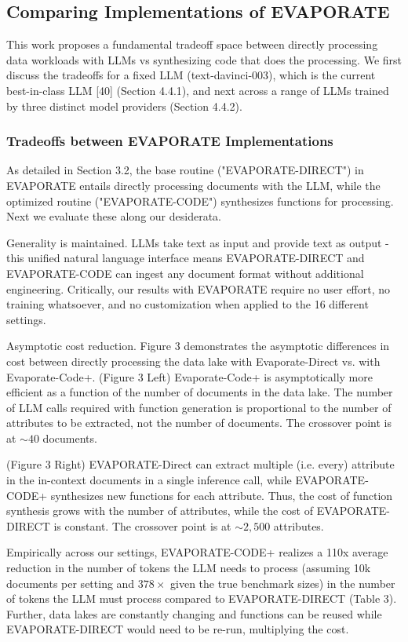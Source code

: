 \documentclass[10pt]{article}
\begin{document}
\subsection{Comparing Implementations of EVAPORATE}
This work proposes a fundamental tradeoff space between directly processing data workloads with LLMs vs synthesizing code that does the processing. We first discuss the tradeoffs for a fixed LLM (text-davinci-003), which is the current best-in-class LLM [40] (Section 4.4.1), and next across a range of LLMs trained by three distinct model providers (Section 4.4.2).

\subsubsection{Tradeoffs between EVAPORATE Implementations}
As detailed in Section 3.2, the base routine ("EVAPORATE-DIRECT") in EVAPORATE entails directly processing documents with the LLM, while the optimized routine ("EVAPORATE-CODE") synthesizes functions for processing. Next we evaluate these along our desiderata.

Generality is maintained. LLMs take text as input and provide text as output - this unified natural language interface means EVAPORATE-DIRECT and EVAPORATE-CODE can ingest any document format without additional engineering. Critically, our results with EVAPORATE require no user effort, no training whatsoever, and no customization when applied to the 16 different settings.

Asymptotic cost reduction. Figure 3 demonstrates the asymptotic differences in cost between directly processing the data lake with Evaporate-Direct vs. with Evaporate-Code+. (Figure 3 Left) Evaporate-Code+ is asymptotically more efficient as a function of the number of documents in the data lake. The number of LLM calls required with function generation is proportional to the number of attributes to be extracted, not the number of documents. The crossover point is at $\sim 40$ documents.

(Figure 3 Right) EVAPORATE-Direct can extract multiple (i.e. every) attribute in the in-context documents in a single inference call, while EVAPORATE-CODE+ synthesizes new functions for each attribute. Thus, the cost of function synthesis grows with the number of attributes, while the cost of EVAPORATE-DIRECT is constant. The crossover point is at $\sim 2,500$ attributes.

Empirically across our settings, EVAPORATE-CODE+ realizes a 110x average reduction in the number of tokens the LLM needs to process (assuming 10k documents per setting and $378 \times$ given the true benchmark sizes) in the number of tokens the LLM must process compared to EVAPORATE-DIRECT (Table 3). Further, data lakes are constantly changing and functions can be reused while EVAPORATE-DIRECT would need to be re-run, multiplying the cost.
\end{document}
